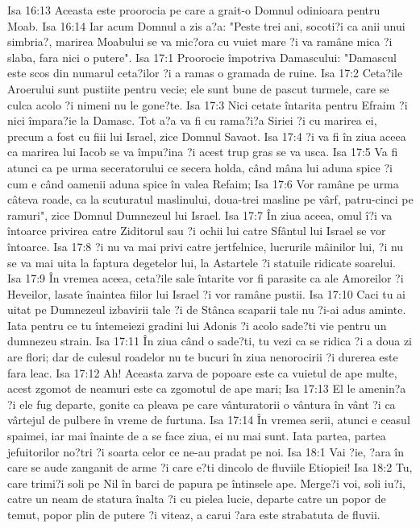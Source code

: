 Isa 16:13  Aceasta este proorocia pe care a grait-o Domnul odinioara pentru Moab.
Isa 16:14  Iar acum Domnul a zis a?a: "Peste trei ani, socoti?i ca anii unui simbria?, marirea Moabului se va mic?ora cu vuiet mare ?i va ramâne mica ?i slaba, fara nici o putere".
Isa 17:1  Proorocie împotriva Damascului: "Damascul este scos din numarul ceta?ilor ?i a ramas o gramada de ruine.
Isa 17:2  Ceta?ile Aroerului sunt pustiite pentru vecie; ele sunt bune de pascut turmele, care se culca acolo ?i nimeni nu le gone?te.
Isa 17:3  Nici cetate întarita pentru Efraim ?i nici împara?ie la Damasc. Tot a?a va fi cu rama?i?a Siriei ?i cu marirea ei, precum a fost cu fiii lui Israel, zice Domnul Savaot.
Isa 17:4  ?i va fi în ziua aceea ca marirea lui Iacob se va împu?ina ?i acest trup gras se va usca.
Isa 17:5  Va fi atunci ca pe urma seceratorului ce secera holda, când mâna lui aduna spice ?i cum e când oamenii aduna spice în valea Refaim;
Isa 17:6  Vor ramâne pe urma câteva roade, ca la scuturatul maslinului, doua-trei masline pe vârf, patru-cinci pe ramuri", zice Domnul Dumnezeul lui Israel.
Isa 17:7  În ziua aceea, omul î?i va întoarce privirea catre Ziditorul sau ?i ochii lui catre Sfântul lui Israel se vor întoarce.
Isa 17:8  ?i nu va mai privi catre jertfelnice, lucrurile mâinilor lui, ?i nu se va mai uita la faptura degetelor lui, la Astartele ?i statuile ridicate soarelui.
Isa 17:9  În vremea aceea, ceta?ile sale întarite vor fi parasite ca ale Amoreilor ?i Heveilor, lasate înaintea fiilor lui Israel ?i vor ramâne pustii.
Isa 17:10  Caci tu ai uitat pe Dumnezeul izbavirii tale ?i de Stânca scaparii tale nu ?i-ai adus aminte. Iata pentru ce tu întemeiezi gradini lui Adonis ?i acolo sade?ti vie pentru un dumnezeu strain.
Isa 17:11  În ziua când o sade?ti, tu vezi ca se ridica ?i a doua zi are flori; dar de culesul roadelor nu te bucuri în ziua nenorocirii ?i durerea este fara leac.
Isa 17:12  Ah! Aceasta zarva de popoare este ca vuietul de ape multe, acest zgomot de neamuri este ca zgomotul de ape mari;
Isa 17:13  El le amenin?a ?i ele fug departe, gonite ca pleava pe care vânturatorii o vântura în vânt ?i ca vârtejul de pulbere în vreme de furtuna.
Isa 17:14  În vremea serii, atunci e ceasul spaimei, iar mai înainte de a se face ziua, ei nu mai sunt. Iata partea, partea jefuitorilor no?tri ?i soarta celor ce ne-au pradat pe noi.
Isa 18:1  Vai ?ie, ?ara în care se aude zanganit de arme ?i care e?ti dincolo de fluviile Etiopiei!
Isa 18:2  Tu, care trimi?i soli pe Nil în barci de papura pe întinsele ape. Merge?i voi, soli iu?i, catre un neam de statura înalta ?i cu pielea lucie, departe catre un popor de temut, popor plin de putere ?i viteaz, a carui ?ara este strabatuta de fluvii.

